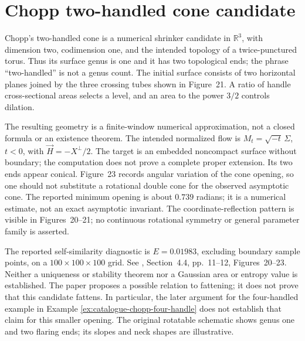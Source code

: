 \chapter{Chopp two-handled cone candidate}\label{sec:catalogue-chopp-two-handle}
\begin{example}\label{ex:catalogue-chopp-two-handle}
Chopp's two-handled cone is a numerical shrinker candidate in
$\mathbb R^3$, with dimension two, codimension one, and the intended
topology of a twice-punctured torus. Thus its surface genus is one and
it has two topological ends; the phrase ``two-handled'' is not a genus count.
The initial surface consists of two horizontal planes joined by the
three crossing tubes shown in Figure~21. A ratio of handle cross-sectional
areas selects a level, and an area to the power $3/2$ controls dilation.

The resulting geometry is a finite-window numerical approximation, not a
closed formula or an existence theorem. The intended normalized flow is
$M_t=\sqrt{-t}\,\Sigma$, $t<0$, with $\vec H=-X^\perp/2$.
The target is an embedded noncompact surface without boundary; the
computation does not prove a complete proper extension. Its two ends
appear conical. Figure~23 records angular variation of the cone opening,
so one should not substitute a rotational double cone for the observed
asymptotic cone. The reported minimum opening is about $0.739$ radians;
it is a numerical estimate, not an exact asymptotic invariant.
The coordinate-reflection pattern is visible in Figures~20--21; no
continuous rotational symmetry or general parameter family is asserted.

The reported self-similarity diagnostic is $E=0.01983$, excluding boundary
sample points, on a $100\times100\times100$ grid.
See \cite{CatChopp1994}, Section~4.4, pp.~11--12, Figures~20--23.
Neither a uniqueness or stability theorem nor a Gaussian area or entropy
value is established. The paper proposes a possible relation to fattening;
it does not prove that this candidate fattens. In particular, the later
argument for the four-handled example in
Example \ref{ex:catalogue-chopp-four-handle} does not establish that claim
for this smaller opening. The original rotatable schematic shows genus
one and two flaring ends; its slopes and neck shapes are illustrative.
\end{example}


